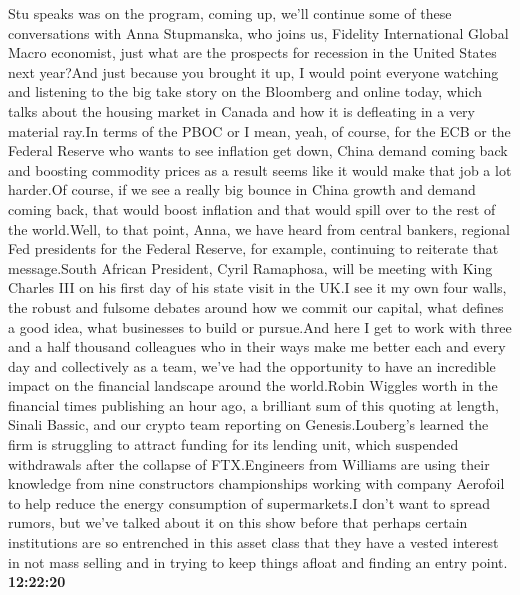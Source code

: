 \documentclass{article}%
\begin{document}
Stu speaks was on the program, coming up, we'll continue some of these conversations with Anna Stupmanska, who joins us, Fidelity International Global Macro economist, just what are the prospects for recession in the United States next year?And just because you brought it up, I would point everyone watching and listening to the big take story on the Bloomberg and online today, which talks about the housing market in Canada and how it is defleating in a very material ray.In terms of the PBOC or I mean, yeah, of course, for the ECB or the Federal Reserve who wants to see inflation get down, China demand coming back and boosting commodity prices as a result seems like it would make that job a lot harder.Of course, if we see a really big bounce in China growth and demand coming back, that would boost inflation and that would spill over to the rest of the world.Well, to that point, Anna, we have heard from central bankers, regional Fed presidents for the Federal Reserve, for example, continuing to reiterate that message.South African President, Cyril Ramaphosa, will be meeting with King Charles III on his first day of his state visit in the UK.I see it my own four walls, the robust and fulsome debates around how we commit our capital, what defines a good idea, what businesses to build or pursue.And here I get to work with three and a half thousand colleagues who in their ways make me better each and every day and collectively as a team, we've had the opportunity to have an incredible impact on the financial landscape around the world.Robin Wiggles worth in the financial times publishing an hour ago, a brilliant sum of this quoting at length, Sinali Bassic, and our crypto team reporting on Genesis.Louberg's learned the firm is struggling to attract funding for its lending unit, which suspended withdrawals after the collapse of FTX.Engineers from Williams are using their knowledge from nine constructors championships working with company Aerofoil to help reduce the energy consumption of supermarkets.I don't want to spread rumors, but we've talked about it on this show before that perhaps certain institutions are so entrenched in this asset class that they have a vested interest in not mass selling and in trying to keep things afloat and finding an entry point.%
\textbf{12:22:20}%
\newline%
\end{document}
